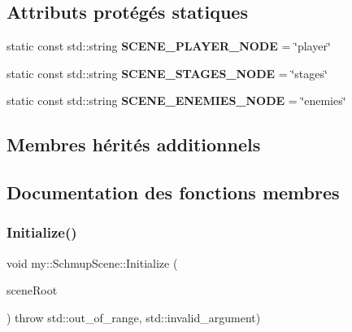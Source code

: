 \subsection*{Attributs protégés statiques}
\begin{DoxyCompactItemize}
\item 
\mbox{\label{classmy_1_1SchmupScene_a40d188c2857e5d7ca60db7b4fc398060}} 
static const std\+::string {\bfseries S\+C\+E\+N\+E\+\_\+\+P\+L\+A\+Y\+E\+R\+\_\+\+N\+O\+DE} = \char`\"{}player\char`\"{}
\item 
\mbox{\label{classmy_1_1SchmupScene_a2d33751f6a799a8a18d4bdeeb94a8fbf}} 
static const std\+::string {\bfseries S\+C\+E\+N\+E\+\_\+\+S\+T\+A\+G\+E\+S\+\_\+\+N\+O\+DE} = \char`\"{}stages\char`\"{}
\item 
\mbox{\label{classmy_1_1SchmupScene_af4c45e8c47507287ef6e8cf1b147beca}} 
static const std\+::string {\bfseries S\+C\+E\+N\+E\+\_\+\+E\+N\+E\+M\+I\+E\+S\+\_\+\+N\+O\+DE} = \char`\"{}enemies\char`\"{}
\end{DoxyCompactItemize}
\subsection*{Membres hérités additionnels}


\subsection{Documentation des fonctions membres}
\mbox{\label{classmy_1_1SchmupScene_ad1febbc7aaf1fc8b2eb4d02cdbf3f57a}} 
\subsubsection{\texorpdfstring{Initialize()}{Initialize()}}
{\footnotesize\ttfamily void my\+::\+Schmup\+Scene\+::\+Initialize (\begin{DoxyParamCaption}\item[{X\+M\+L\+Node\+::\+X\+M\+L\+Node\+Ptr}]{scene\+Root }\end{DoxyParamCaption}) throw  std\+::out\+\_\+of\+\_\+range, std\+::invalid\+\_\+argument) \hspace{0.3cm}{\ttfamily [virtual]}}



